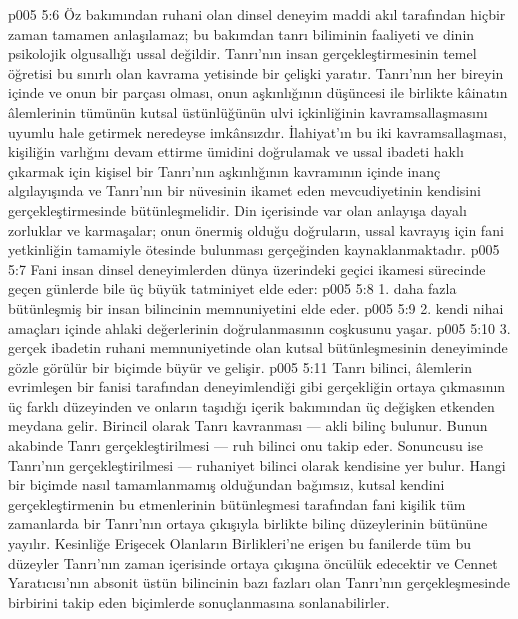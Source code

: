 \vs p005 5:6 Öz bakımından ruhani olan dinsel deneyim maddi akıl tarafından hiçbir zaman tamamen anlaşılamaz; bu bakımdan tanrı biliminin faaliyeti ve dinin psikolojik olgusallığı ussal değildir. Tanrı’nın insan gerçekleştirmesinin temel öğretisi bu sınırlı olan kavrama yetisinde bir çelişki yaratır. Tanrı’nın her bireyin içinde ve onun bir parçası olması, onun aşkınlığının düşüncesi ile birlikte kâinatın âlemlerinin tümünün kutsal üstünlüğünün ulvi içkinliğinin kavramsallaşmasını uyumlu hale getirmek neredeyse imkânsızdır. İlahiyat’ın bu iki kavramsallaşması, kişiliğin varlığını devam ettirme ümidini doğrulamak ve ussal ibadeti haklı çıkarmak için kişisel bir Tanrı’nın aşkınlığının kavramının içinde inanç algılayışında ve Tanrı’nın bir nüvesinin ikamet eden mevcudiyetinin kendisini gerçekleştirmesinde bütünleşmelidir. Din içerisinde var olan anlayışa dayalı zorluklar ve karmaşalar; onun önermiş olduğu doğruların, ussal kavrayış için fani yetkinliğin tamamiyle ötesinde bulunması gerçeğinden kaynaklanmaktadır.
\vs p005 5:7 Fani insan dinsel deneyimlerden dünya üzerindeki geçici ikamesi sürecinde geçen günlerde bile üç büyük tatminiyet elde eder:
\vs p005 5:8 1.\bibnobreakspace {} daha fazla bütünleşmiş bir insan bilincinin memnuniyetini elde eder.
\vs p005 5:9 2.\bibnobreakspace {} kendi nihai amaçları içinde ahlaki değerlerinin doğrulanmasının coşkusunu yaşar.
\vs p005 5:10 3.\bibnobreakspace {} gerçek ibadetin ruhani memnuniyetinde olan kutsal bütünleşmesinin deneyiminde gözle görülür bir biçimde büyür ve gelişir.
\vs p005 5:11 Tanrı bilinci, âlemlerin evrimleşen bir fanisi tarafından deneyimlendiği gibi gerçekliğin ortaya çıkmasının üç farklı düzeyinden ve onların taşıdığı içerik bakımından üç değişken etkenden meydana gelir. Birincil olarak Tanrı  kavranması --- akli bilinç bulunur. Bunun akabinde Tanrı  gerçekleştirilmesi --- ruh bilinci onu takip eder. Sonuncusu ise Tanrı’nın gerçekleştirilmesi --- ruhaniyet bilinci olarak kendisine yer bulur. Hangi bir biçimde nasıl tamamlanmamış olduğundan bağımsız, kutsal kendini gerçekleştirmenin bu etmenlerinin bütünleşmesi tarafından fani kişilik tüm zamanlarda bir Tanrı’nın  ortaya çıkışıyla birlikte bilinç düzeylerinin bütününe yayılır. Kesinliğe Erişecek Olanların Birlikleri’ne erişen bu fanilerde tüm bu düzeyler Tanrı’nın  zaman içerisinde ortaya çıkışına öncülük edecektir ve Cennet Yaratıcısı’nın absonit üstün bilincinin bazı fazları olan Tanrı’nın  gerçekleşmesinde birbirini takip eden biçimlerde sonuçlanmasına sonlanabilirler.
